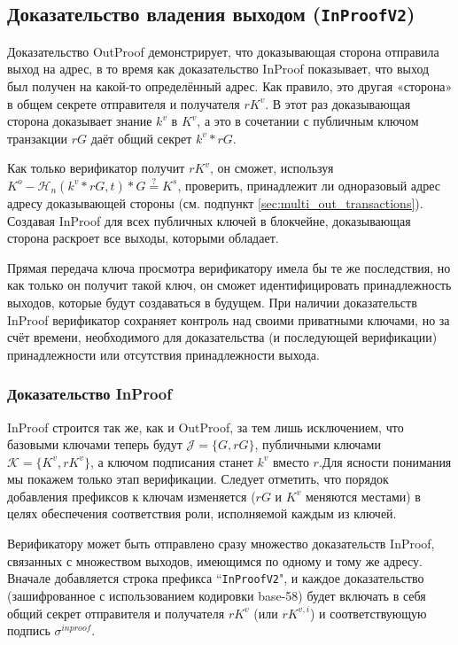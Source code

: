 \subsection{Доказательство владения выходом ({\tt InProofV2})}
\label{subsec:proofs-output-ownership-inproof}

Доказательство OutProof демонстрирует, что доказывающая сторона отправила выход на адрес, в то время как доказательство InProof показывает, что выход был получен на какой-то определённый адрес. Как правило, это другая «сторона» в общем секрете отправителя и получателя $r K^v$. В этот раз доказывающая сторона доказывает знание $k^v$ в $K^v$, а это в сочетании с публичным ключом транзакции $r G$ даёт общий секрет $k^v*r G$.

Как только верификатор получит $r K^v$, он сможет, используя $K^o - \mathcal{H}_n(k^v*rG,t)*G \stackrel{?}{=} K^s$, проверить, принадлежит ли одноразовый адрес адресу доказывающей стороны (см. подпункт \ref{sec:multi_out_transactions}). Создавая InProof для всех публичных ключей в блокчейне, доказывающая сторона раскроет все выходы, которыми обладает.

Прямая передача ключа просмотра верификатору имела бы те же последствия, но как только он получит такой ключ, он сможет идентифицировать принадлежность выходов, которые будут создаваться в будущем. При наличии доказательств InProof верификатор сохраняет контроль над своими приватными ключами, но за счёт времени, необходимого для доказатель\-ства (и последующей верификации) принадлежности или отсутствия принадлежности выхода.

\subsubsection*{Доказательство InProof}

InProof строится так же, как и OutProof, за тем лишь исключением, что базовыми ключами теперь будут $\mathcal{J} = \{G, r G\}$, публичными ключами $\mathcal{K} = \{K^v, r K^{v}\}$, а ключом подписания станет $k^v$ вместо $r$.Для ясности понимания мы покажем только этап верификации. Следует отметить, что порядок добавления префиксов к ключам изменяется ($r G$ и $K^v$ меняются местами) в целях обеспечения соответствия роли, исполняемой каждым из ключей.

Верификатору может быть отправлено сразу множество доказательств InProof, связанных с множеством выходов, имеющимся по одному и тому же адресу. Вначале добавляется строка префикса ``{\tt InProofV2}", и каждое доказательство (зашифрованное с использованием кодировки base-58) будет включать в себя общий секрет отправителя и получателя $r K^v$ (или $r K^{v,i}$) и соответствующую подпись $\sigma^{inproof}$.

